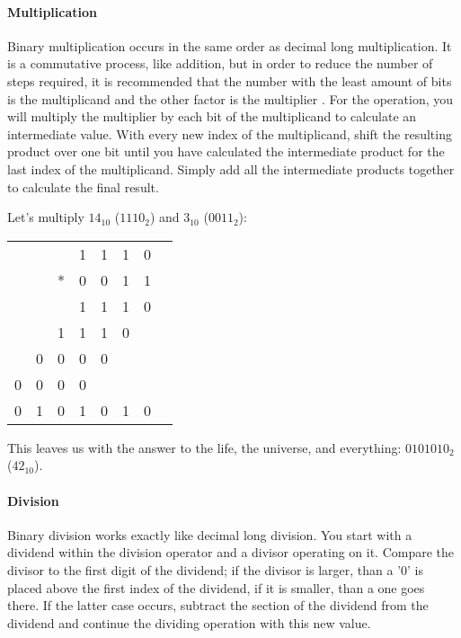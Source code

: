     \paragraph*{Multiplication} Binary multiplication occurs in the same order as decimal long multiplication.
    It is a commutative process, like addition, but in order to reduce the number of steps required, it is recommended that the number with the least amount of bits is the multiplicand  and the other factor is the multiplier .
    For the operation, you will multiply the multiplier by each bit of the multiplicand to calculate an intermediate value.
    With every new index of the multiplicand, shift the resulting product over one bit until you have calculated the intermediate product for the last index of the multiplicand.
    Simply add all the intermediate products together to calculate the final result.

    \begin{example}
        Let's multiply $14_{10}$ ($1110_2$) and $3_{10}$ ($0011_2$):
        \begin{center}
            \begin{tabular}{cccccccc}
                  &   &   & 1 & 1 & 1 & 0 \\
                  &   & * & 0 & 0 & 1 & 1 \\
                \hline
                  &   &   & 1 & 1 & 1 & 0 \\
                  &   & 1 & 1 & 1 & 0 &   \\
                  & 0 & 0 & 0 & 0 &   &   \\
                0 & 0 & 0 & 0 &   &   &   \\
                \hline
                0 & 1 & 0 & 1 & 0 & 1 & 0 \\  
            \end{tabular}
        \end{center}
        This leaves us with the answer to the life, the universe, and everything: $0101010_2$ ($42_{10}$).
    \end{example}

    \paragraph*{Division} Binary division works exactly like decimal long division.
    You start with a dividend within the division operator and a divisor operating on it.
    Compare the divisor to the first digit of the dividend; if the divisor is larger, than a '0' is placed above the first index of the dividend, if it is smaller, than a one goes there.
    If the latter case occurs, subtract the section of the dividend from the dividend and continue the dividing operation with this new value.

